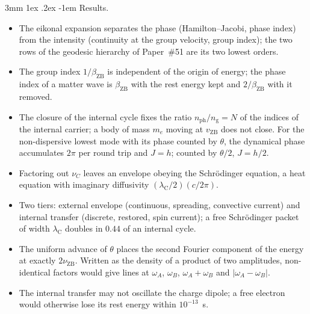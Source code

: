 \documentclass[%
 reprint, amsmath,amssymb, aps, prb, ]{revtex4-2}
\makeatletter
\numberwithin{equation}{section}
\renewcommand\paragraph{%
  \@startsection{paragraph}{4}{\z@}%
    {3mm \@plus 1ex \@minus .2ex}%
    {-1em}%
    {\normalfont\normalsize\itshape}}
\newcommand{\iphase}{\theta}  %
\newcommand{\lambdaC}{\lambda_{\mathrm{C}}}
\newcommand{\bZB}{\beta_{\mathrm{ZB}}}
\newcommand{\nph}{n_{\mathrm{ph}}}
\newcommand{\ngr}{n_{\mathrm{g}}}
\makeatother
\begin{document}
\paragraph{Results.}
\begin{itemize}[leftmargin=2.4em]
\item[R1.] The eikonal expansion separates the phase (Hamilton--Jacobi, phase index) from the intensity (continuity at the group velocity, group index); the two rows of the geodesic hierarchy of Paper~\#51 are its two lowest orders.
\item[R2.] The group index $1/\bZB$ is independent of the origin of energy; the phase index of a matter wave is $\bZB$ with the rest energy kept and $2/\bZB$ with it removed.
\item[R3.] The closure of the internal cycle fixes the ratio $\nph/\ngr = N$ of the indices of the internal carrier; a body of mass $m_e$ moving at $v_{\mathrm{ZB}}$ does not close. For the non-dispersive lowest mode with its phase counted by $\iphase$, the dynamical phase accumulates $2\pi$ per round trip and $J = h$; counted by $\iphase/2$, $J = h/2$.
\item[R4.] Factoring out $\nu_C$ leaves an envelope obeying the Schr\"odinger equation, a heat equation with imaginary diffusivity $(\lambdaC/2)(c/2\pi)$.
\item[R5.] Two tiers: external envelope (continuous, spreading, convective current) and internal transfer (discrete, restored, spin current); a free Schr\"odinger packet of width $\lambdaC$ doubles in $0.44$ of an internal cycle.
\item[R6.] The uniform advance of $\iphase$ places the second Fourier component of the energy at exactly $2\nu_{\mathrm{ZB}}$. Written as the density of a product of two amplitudes, non-identical factors would give lines at $\omega_A$, $\omega_B$, $\omega_A + \omega_B$ and $|\omega_A - \omega_B|$.
\item[R7.] The internal transfer may not oscillate the charge dipole; a free electron would otherwise lose its rest energy within $10^{-13}$~s.
\end{itemize}
\end{document}
